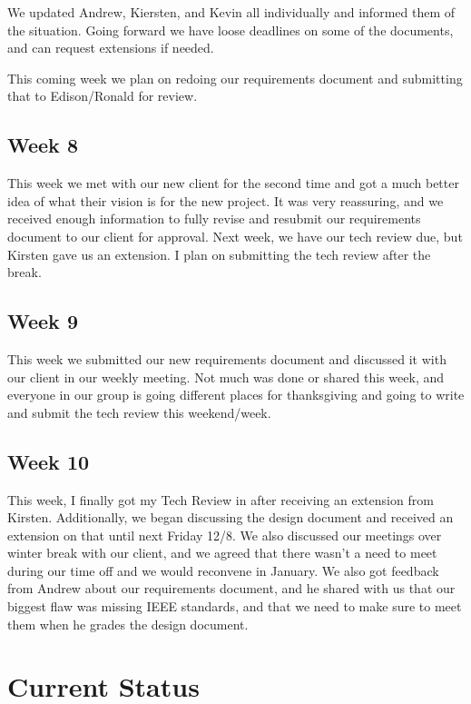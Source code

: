 \documentclass[letterpaper,10pt,titlepage,journal,compsoc,draftclsnofoot,onecolumn]{IEEEtran}
\begin{document}
        We updated Andrew, Kiersten, and Kevin all individually and informed them of the situation. Going forward we have loose deadlines on some of the documents, and can request extensions if needed. 
 
        This coming week we plan on redoing our requirements document and submitting that to Edison/Ronald for review. 
    
    \subsection{Week 8}
        This week we met with our new client for the second time and got a much better idea of what their vision is for the new project. It was very reassuring, and we received enough information to fully revise and resubmit our requirements document to our client for approval. Next week, we have our tech review due, but Kirsten gave us an extension. I plan on submitting the tech review after the break. 

            
    \subsection{Week 9}
        This week we submitted our new requirements document and discussed it with our client in our weekly meeting. Not much was done or shared this week, and everyone in our group is going different places for thanksgiving and going to write and submit the tech review this weekend/week. 

            
            
    \subsection{Week 10}
        This week, I finally got my Tech Review in after receiving an extension from Kirsten. Additionally, we began discussing the design document and received an extension on that until next Friday 12/8. We also discussed our meetings over winter break with our client, and we agreed that there wasn't a need to meet during our time off and we would reconvene in January. We also got feedback from Andrew about our requirements document, and he shared with us that our biggest flaw was missing IEEE standards, and that we need to make sure to meet them when he grades the design document. 

\section{Current Status}
\end{document}
